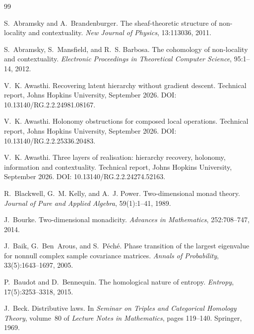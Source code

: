 \documentclass[11pt]{article}
\theoremstyle{definition}
\theoremstyle{remark}
\begin{document}
\begin{thebibliography}{99}

S.~Abramsky and A.~Brandenburger.
\newblock The sheaf-theoretic structure of non-locality and contextuality.
\newblock \emph{New Journal of Physics}, 13:113036, 2011.

S.~Abramsky, S.~Mansfield, and R.~S. Barbosa.
\newblock The cohomology of non-locality and contextuality.
\newblock \emph{Electronic Proceedings in Theoretical Computer Science}, 95:1--14, 2012.

V.~K. Awasthi.
\newblock Recovering latent hierarchy without gradient descent.
\newblock Technical report, Johns Hopkins University, September 2026.
\newblock DOI: 10.13140/RG.2.2.24981.08167.

V.~K. Awasthi.
\newblock Holonomy obstructions for composed local operations.
\newblock Technical report, Johns Hopkins University, September 2026.
\newblock DOI: 10.13140/RG.2.2.25336.20483.

V.~K. Awasthi.
\newblock Three layers of realisation: hierarchy recovery, holonomy, information and contextuality.
\newblock Technical report, Johns Hopkins University, September 2026.
\newblock DOI: 10.13140/RG.2.2.24274.52163.

R.~Blackwell, G.~M. Kelly, and A.~J. Power.
\newblock Two-dimensional monad theory.
\newblock \emph{Journal of Pure and Applied Algebra}, 59(1):1--41, 1989.

J.~Bourke.
\newblock Two-dimensional monadicity.
\newblock \emph{Advances in Mathematics}, 252:708--747, 2014.

J.~Baik, G.~Ben~Arous, and S.~P\'ech\'e.
\newblock Phase transition of the largest eigenvalue for nonnull complex sample covariance matrices.
\newblock \emph{Annals of Probability}, 33(5):1643--1697, 2005.

P.~Baudot and D.~Bennequin.
\newblock The homological nature of entropy.
\newblock \emph{Entropy}, 17(5):3253--3318, 2015.

J.~Beck.
\newblock Distributive laws.
\newblock In \emph{Seminar on Triples and Categorical Homology Theory}, volume~80 of \emph{Lecture
  Notes in Mathematics}, pages 119--140. Springer, 1969.


\end{thebibliography}
\end{document}
